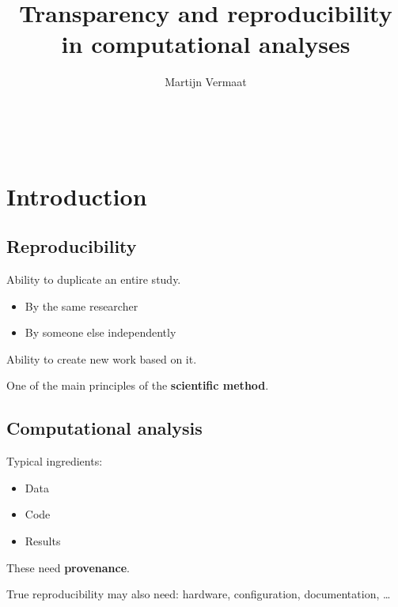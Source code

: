 \documentclass[slidestop]{beamer}
\author{Martijn Vermaat}
\title{Transparency and reproducibility in computational analyses}
\begin{document}

\makeTitleSlide\

\section{Introduction}

\subsection{Reproducibility}
\begin{pframe}
  Ability to duplicate an entire study.
  \begin{itemize}
    \item By the same researcher
    \item By someone else independently
  \end{itemize}

  \bigskip
  \pause
  Ability to create new work based on it.

  \bigskip
  \pause
  One of the main principles of the {\bf scientific method}.

\end{pframe}

\subsection{Computational analysis}
\begin{pframe}
  Typical ingredients:
  \begin{itemize}
    \item Data
    \item Code
    \item Results
  \end{itemize}

  \bigskip
  \pause
  These need {\bf provenance}.

  \bigskip
  \pause
  True reproducibility may also need: hardware, configuration, documentation,
  \ldots
\end{pframe}
\end{document}
